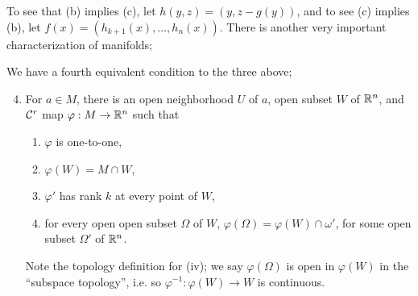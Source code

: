 \noindent To see that (b) implies (c), let $h(y, z) = (y, z - g(y))$, and to see (c) implies (b), let $f(x) = (h_{k+1}(x), \dots, h_n(x))$.
\medskip\newline
There is another very important characterization of manifolds;
\begin{simplethm}
    We have a fourth equivalent condition to the three above;
    \begin{enumerate}[label=(\alph*)]
        \setcounter{enumi}{3}
        \item For $a \in M$, there is an open neighborhood $U$ of $a$, open subset $W$ of $\mathbb R^n$, and $\mathcal C^r$ map $\varphi : M \to \mathbb R^n$ such that
        \begin{enumerate}[label=(\roman*)]
            \item $\varphi$ is one-to-one,
            \item $\varphi(W) = M \cap W$,
            \item $\varphi'$ has rank $k$ at every point of $W$,
            \item for every open open subset $\Omega$ of $W$, $\varphi(\Omega) = \varphi(W) \cap \omega'$, for some open subset $\Omega'$ of $\mathbb R^n$.
        \end{enumerate}
        Note the topology definition for (iv); we say $\varphi(\Omega)$ is open in $\varphi(W)$ in the ``subspace topology'', i.e. so $\varphi^{-1} : \varphi(W) \to W$ is continuous.
    \end{enumerate}
\end{simplethm}

